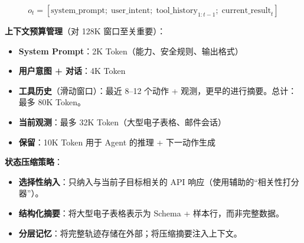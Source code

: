 \begin{equation}
o_t = [\text{system\_prompt};\; \text{user\_intent};\; \text{tool\_history}_{1:t-1};\; \text{current\_result}_t]
\end{equation}

\textbf{上下文预算管理}（对 128K 窗口至关重要）：

\begin{itemize}
  \item \textbf{System Prompt}：2K Token（能力、安全规则、输出格式）
  \item \textbf{用户意图 + 对话}：4K Token
  \item \textbf{工具历史}（滑动窗口）：最近 8--12 个动作 + 观测，更早的进行摘要。总计：最多 80K Token。
  \item \textbf{当前观测}：最多 32K Token（大型电子表格、邮件会话）
  \item \textbf{保留}：10K Token 用于 Agent 的推理 + 下一动作生成
\end{itemize}

\textbf{状态压缩策略}：

\begin{itemize}
  \item \textbf{选择性纳入}：只纳入与当前子目标相关的 API 响应（使用辅助的``相关性打分器''）。
  \item \textbf{结构化摘要}：将大型电子表格表示为 Schema + 样本行，而非完整数据。
  \item \textbf{分层记忆}：将完整轨迹存储在外部；将压缩摘要注入上下文。
\end{itemize}

